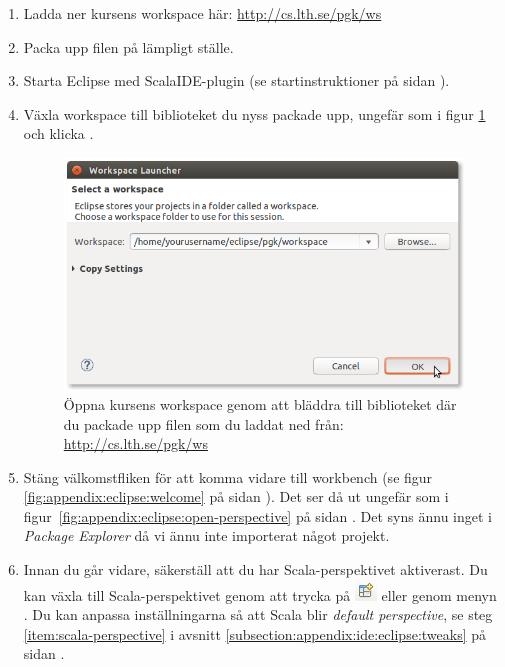 \begin{enumerate}
\item Ladda ner kursens workspace här: \url{http://cs.lth.se/pgk/ws}

\item Packa upp filen på lämpligt ställe.

\item Starta Eclipse med ScalaIDE-plugin (se startinstruktioner på sidan \pageref{subsubsection:start:eclipse}). 

\item Växla workspace till biblioteket du nyss packade upp, ungefär som i figur \ref{fig:eclipse:ide:open} och klicka .

\begin{figure}[H]
\centering
\includegraphics[width=1.0\textwidth]{../img/eclipse/eclipse-select-workspace.png}
\caption {Öppna kursens workspace genom att bläddra till biblioteket där du packade upp filen som du laddat ned från: \url{http://cs.lth.se/pgk/ws} }
\label{fig:eclipse:ide:open}
\end{figure}

\item Stäng välkomstfliken för att komma vidare till workbench (se figur \ref{fig:appendix:eclipse:welcome} på sidan \pageref{fig:appendix:eclipse:welcome}). Det ser då ut ungefär som i figur~\ref{fig:appendix:eclipse:open-perspective} på sidan \pageref{fig:appendix:eclipse:open-perspective}. Det syns ännu inget i \textit{Package Explorer} då vi ännu inte importerat något projekt. 

\item Innan du går vidare, säkerställ att du har Scala-perspektivet aktiverast. Du kan växla till Scala-perspektivet genom att trycka på \includegraphics[scale=0.75]{../img/eclipse/eclipse-perspective-button.png} eller genom menyn .
Du kan anpassa inställningarna så att Scala blir \textit{default perspective}, se steg \ref{item:scala-perspective} i avsnitt \ref{subsection:appendix:ide:eclipse:tweaks} på sidan \pageref{subsection:appendix:ide:eclipse:tweaks}.



\end{enumerate}
